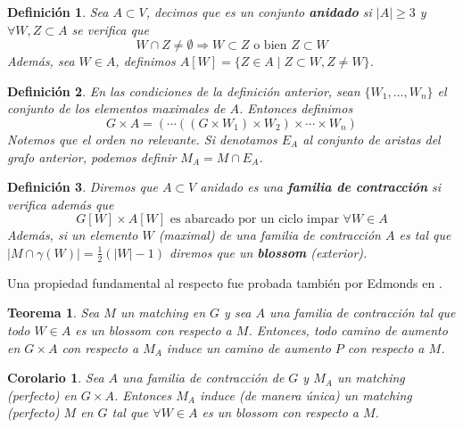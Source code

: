 \documentclass[twoside,a4paper,openright,12pt,tikz]{book}
\newtheorem{defi}{Definici\'on}[section]
\newtheorem{thm}{Teorema}[section]
\newtheorem{cor}{Corolario}[section]
\begin{document}
\begin{defi}
Sea $A\subset V$, decimos que es un conjunto \textbf{anidado} si $|A|\geq 3$ y $\forall W,Z\subset A$ se verifica que 
$$
W\cap Z \neq \emptyset \Rightarrow W\subset Z \text{ o bien } Z\subset W
$$
Además, sea $W \in A$, definimos $A[W] =\{Z\in A \mid Z\subset W, Z\neq W\}$.
\end{defi}
\begin{defi}
En las condiciones de la definición anterior, sean $\{W_1,\dotsc,W_n\}$ el conjunto de los elementos maximales de $A$. Entonces definimos
$$
G\times A = (\cdots((G\times W_1)\times W_2)\times \cdots \times W_n)
$$
Notemos que el orden no relevante. Si denotamos $E_A$ al conjunto de aristas del grafo anterior, podemos definir $M_A = M\cap E_A$. 
\end{defi}
\begin{defi}
Diremos que $A \subset V$ anidado es una \textbf{familia de contracción} si verifica además que
$$
G[W]\times A[W] \text{ es abarcado por un ciclo impar $\forall W \in A$}
$$ 
Además, si un elemento $W$ (maximal) de una familia de contracción $A$ es tal que $|M\cap\gamma(W)| = \frac{1}{2}(|W|-1)$ diremos que un \textbf{blossom} (exterior).
\end{defi}
Una propiedad fundamental al respecto fue probada también por Edmonds en \cite{edmon2}.
\begin{thm}
Sea $M$ un matching en $G$ y sea $A$ una familia de contracción tal que todo $W\in A$ es un blossom con respecto a $M$. Entonces, todo camino de aumento en $G\times A$ con respecto a $M_A$ induce un camino de aumento $P$ con respecto a $M$.
\end{thm}
\begin{cor}
Sea $A$ una familia de contracción de $G$ y $M_A$ un matching (perfecto) en $G\times A$. Entonces $M_A$ induce (de manera única) un matching (perfecto) $M$ en $G$ tal que $\forall W\in A$ es un blossom con respecto a $M$.
\end{cor}
\end{document}

